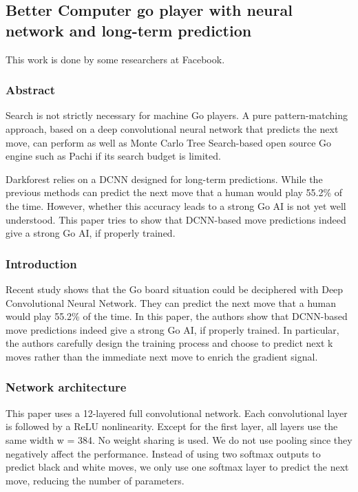 \subsection{Better Computer go player with neural network and long-term prediction~\cite{tian2015better, schaeffer2001temporal}}
This work is done by some researchers at Facebook.
\subsubsection{Abstract}
Search is not strictly necessary for machine Go players. A pure pattern-matching approach, based on a deep convolutional neural network that predicts the next move, can perform as well as Monte Carlo Tree Search-based open source Go engine such as Pachi if its search budget is limited.

Darkforest relies on a DCNN designed for long-term predictions. While the previous methods can predict the next move that a human would play 55.2\% of the time. However, whether this accuracy leads to a strong Go AI is not yet well understood. This paper tries to show that DCNN-based move predictions indeed give a strong Go AI, if properly trained.
\subsubsection{Introduction}
Recent study shows that the Go board situation could be deciphered with Deep Convolutional Neural Network. They can predict the next move that a human would play 55.2\% of the time. In this paper, the authors show that DCNN-based move predictions indeed give a strong Go AI, if properly trained. In particular, the authors carefully design the training process and choose to predict next k moves rather than the immediate next move to enrich the gradient signal.
%
\subsubsection{Network architecture}
This paper uses a 12-layered full convolutional network. Each convolutional layer is followed by a ReLU 
nonlinearity. Except for the first layer, all layers use the same width w = 384. No weight sharing is used. 
We do not use pooling since they negatively affect the performance. Instead of using two softmax outputs to 
predict black and white moves, we only use one softmax layer to predict the next move, reducing the number 
of parameters.
